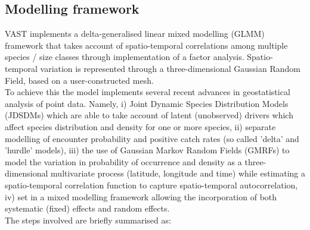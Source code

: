 \documentclass[11pt]{article}
\begin{document}
\subsection{Modelling framework}

VAST implements a delta-generalised linear mixed modelling (GLMM) framework
that takes account of spatio-temporal correlations among multiple species /
size classes through implementation of a factor analysis.  Spatio-temporal
variation is represented through a three-dimensional Gaussian Random Field,
based on a user-constructed mesh.  \\

To achieve this the model implements several recent advances in geostatistical
analysis of point data. Namely, i) Joint Dynamic Species Distribution Models
(JDSDMs) which are able to take account of latent (unobserved) drivers which
affect species distribution and density for one or more species, ii) separate
modelling of encounter probability and positive catch rates (so called 'delta'
and 'hurdle' models), iii) the use of Gaussian Markov Random Fields (GMRFs) to
model the variation in probability of occurrence and density as a
three-dimensional multivariate process (latitude, longitude and time) while
estimating a spatio-temporal correlation function to capture spatio-temporal
autocorrelation, iv) set in a mixed modelling framework allowing the
incorporation of both systematic (fixed) effects and random effects. \\

The steps involved are briefly summarised as:
\end{document}
